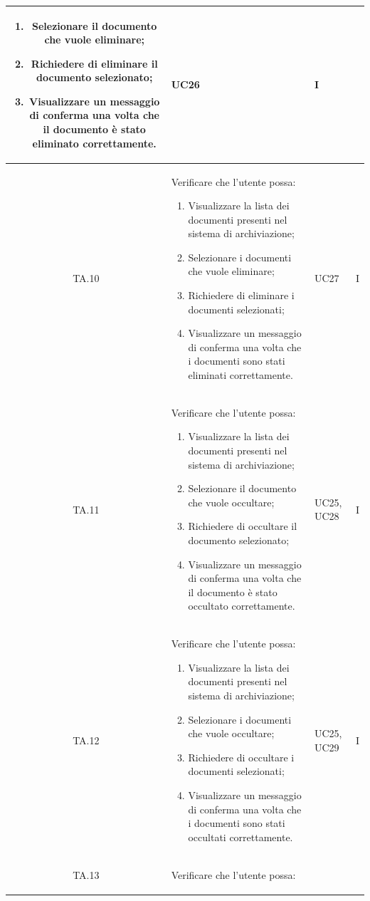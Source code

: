 \documentclass[10pt, a4paper]{article}
\begin{document}
\begin{xltabular}{\textwidth}{|c|X|p{2.5cm}|c|}
\begin{enumerate}
    \item Selezionare il documento che vuole eliminare;
    \item Richiedere di eliminare il documento selezionato;
    \item Visualizzare un messaggio di conferma una volta che il documento è stato eliminato correttamente.
\end{enumerate}
& UC26 & I \\
\hline
TA.10 & Verificare che l'utente possa:
\begin{enumerate}
    \item Visualizzare la lista dei documenti presenti nel sistema di archiviazione;
    \item Selezionare i documenti che vuole eliminare;
    \item Richiedere di eliminare i documenti selezionati;
    \item Visualizzare un messaggio di conferma una volta che i documenti sono stati eliminati correttamente.
\end{enumerate}
& UC27 & I \\
\hline
TA.11 & Verificare che l'utente possa:
\begin{enumerate}
    \item Visualizzare la lista dei documenti presenti nel sistema di archiviazione;
    \item Selezionare il documento che vuole occultare;
    \item Richiedere di occultare il documento selezionato;
    \item Visualizzare un messaggio di conferma una volta che il documento è stato occultato correttamente.
\end{enumerate}
& UC25, UC28 & I \\
\hline
TA.12 & Verificare che l'utente possa:
\begin{enumerate}
    \item Visualizzare la lista dei documenti presenti nel sistema di archiviazione;
    \item Selezionare i documenti che vuole occultare;
    \item Richiedere di occultare i documenti selezionati;
    \item Visualizzare un messaggio di conferma una volta che i documenti sono stati occultati correttamente.
\end{enumerate}
& UC25, UC29 & I \\
\hline
TA.13 & Verificare che l'utente possa:
\begin{enumerate}

\end{enumerate}
\end{xltabular}
\end{document}
